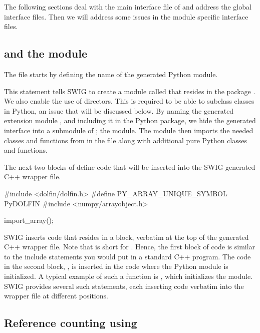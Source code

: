 The following sections deal with the main interface file of 
and address the global interface files. Then we will address some issues
in the module specific interface files.

\subsection{ and the  module}
The file  starts by defining the name of the generated
Python module.
\pagebreak
\begin{swigcode}
\end{swigcode}
This statement tells SWIG to create a module called  that
resides in the package \dolfin{}. We also enable the use of
directors.  This is required to be able to subclass \dolfin classes
in Python, an issue that will be discussed below.  By naming the generated
extension module , and including it in the \dolfin{} Python
package, we hide the generated interface into a submodule of \dolfin{}; the
 module.  The \dolfin{} module then imports the needed
classes and functions from  in the 
file along with additional pure Python classes and functions.

The next two blocks of  define code that will be inserted
into the SWIG generated C++ wrapper file.
\begin{swigcode}
#include <dolfin/dolfin.h>
#define PY_ARRAY_UNIQUE_SYMBOL PyDOLFIN
#include <numpy/arrayobject.h>

import_array();
\end{swigcode}
SWIG inserts code that resides in a \emp{\%\{$\ldots$\%\}} block,
verbatim at the top of the generated C++ wrapper file. Note that
\emp{\%\{$\ldots$\%\}} is short for . Hence,
the first block of code is similar to the include statements you
would put in a standard C++ program. The code in the second block,
, is inserted in the code where the
Python module is initialized. A typical example of such a function is
, which initializes the \numpy module. SWIG provides
several such statements, each inserting code verbatim into the wrapper
file at different positions.

\subsection{Reference counting using }

